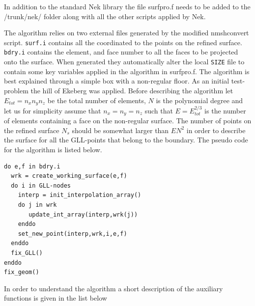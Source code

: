 In addition to the standard Nek library the file surfpro.f needs to be added to 
the /trunk/nek/ folder along with all the other scripts applied by Nek.

The algorithm relies on two external files generated by the modified nmshconvert script.
\verb|surf.i| contains all the coordinated to the points on the refined surface. 
\verb|bdry.i| contains the element, and face number to all the faces to be projected onto the surface.
When generated they automatically alter the local \verb|SIZE| file to contain some key variables 
applied in the algorithm in surfpro.f.
The algorithm is best explained through a simple box with a non-regular floor. 
As an initial test-problem the hill of Ekeberg was applied. 
Before describing the algorithm let $E_{tot} = n_xn_yn_z$  be the total number of elements, 
$N$ is the polynomial degree and let us for simplicity assume that $n_x=n_y=n_z$ such that 
$E= E_{tot}^{2/3}$ is the number of elements containing a face on the non-regular surface.
The number of points on the refined surface $N_s$ should be somewhat larger than $EN^2$ in 
order to describe the surface for all the GLL-points that belong to the boundary. 
The pseudo code for the algorithm is listed below.
%
\begingroup
\fontsize{12pt}{14pt}
\begin{lstlisting}[escapechar=|,frame=none]
do e,f in bdry.i
  wrk = create_working_surface(e,f)
  do i in GLL-nodes
    interp = init_interpolation_array() 
    do j in wrk
       update_int_array(interp,wrk(j))
    enddo
    set_new_point(interp,wrk,i,e,f)
  enddo
  fix_GLL()
enddo
fix_geom()
\end{lstlisting}
\endgroup
% 
In order to understand the algorithm a short description of the auxiliary functions is 
given in the list below

